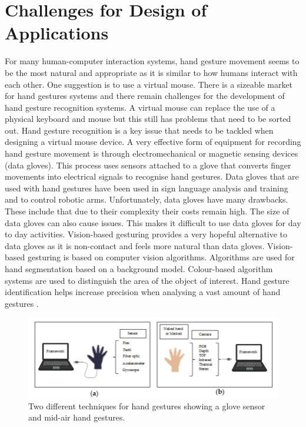 \documentclass{article}
\begin{document}
\section*{Challenges for Design of Applications}
For many human-computer interaction systems, hand gesture movement seems to be the most natural and appropriate as it is similar to how humans interact with each other. One suggestion is to use a virtual mouse. There is a sizeable market for hand gestures systems and there remain challenges for the development of hand gesture recognition systems. A virtual mouse can replace the use of a physical keyboard and mouse but this still has problems that need to be sorted out. Hand gesture recognition is a key issue that needs to be tackled when designing a virtual mouse device. A very effective form of equipment for recording hand gesture movement is through electromechanical or magnetic sensing devices (data gloves). This process uses sensors attached to a glove that converts finger movements into electrical signals to recognise hand gestures. Data gloves that are used with hand gestures have been used in sign language analysis and training and to control robotic arms. Unfortunately, data gloves have many drawbacks. These include that due to their complexity their costs remain high. The size of data gloves can also cause issues. This makes it difficult to use data gloves for day to day activities. Vision-based gesturing provides a very hopeful alternative to data gloves as it is non-contact and feels more natural than data gloves. Vision-based gesturing is based on computer vision algorithms. Algorithms are used for hand segmentation based on a background model. Colour-based algorithm systems are used to distinguish the area of the object of interest. Hand gesture identification helps increase precision when analysing a vast amount of hand gestures \cite{tsai2020design}.

\begin{figure}[H]
	\centering
	\includegraphics[width=1.0\linewidth]{images/different-techniques-for-hand-gestures-a-Glove-based-attached-sensor-either-connected.png}
	\caption{Two different techniques for hand gestures showing a glove sensor and mid-air hand gestures.}
	\label{fig:Two different techniques for hand gestures showing a glove sensor and mid-air hand gestures.}
\end{figure}
\end{document}

